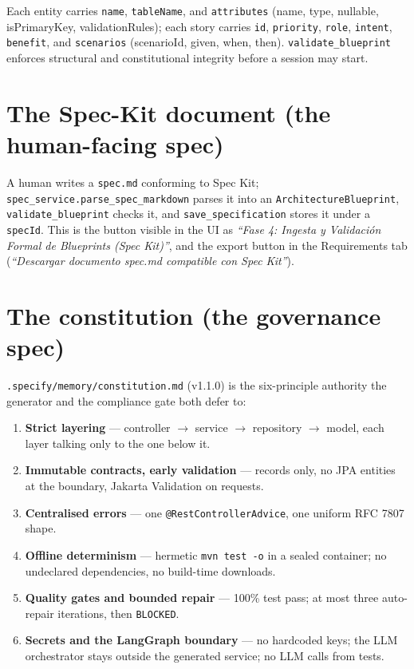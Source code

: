 \documentclass[11pt,a4paper]{article}
\begin{document}
Each entity carries \texttt{name}, \texttt{tableName}, and \texttt{attributes}
(name, type, nullable, isPrimaryKey, validationRules); each story carries \texttt{id},
\texttt{priority}, \texttt{role}, \texttt{intent}, \texttt{benefit}, and
\texttt{scenarios} (scenarioId, given, when, then). \texttt{validate\_blueprint}
enforces structural and constitutional integrity before a session may start.

\section{The Spec-Kit document (the human-facing spec)}

A human writes a \texttt{spec.md} conforming to Spec Kit; \texttt{spec\_service.parse\_spec\_markdown}
parses it into an \texttt{ArchitectureBlueprint}, \texttt{validate\_blueprint} checks
it, and \texttt{save\_specification} stores it under a \texttt{specId}. This is the
button visible in the UI as \emph{``Fase 4: Ingesta y Validación Formal de Blueprints
(Spec Kit)''}, and the export button in the Requirements tab
(\emph{``Descargar documento spec.md compatible con Spec Kit''}).

\section{The constitution (the governance spec)}

\texttt{.specify/memory/constitution.md} (v1.1.0) is the six-principle authority the
generator and the compliance gate both defer to:

\begin{enumerate}[leftmargin=1.4em]
  \item \textbf{Strict layering} --- controller $\rightarrow$ service $\rightarrow$
  repository $\rightarrow$ model, each layer talking only to the one below it.
  \item \textbf{Immutable contracts, early validation} --- records only, no JPA
  entities at the boundary, Jakarta Validation on requests.
  \item \textbf{Centralised errors} --- one \texttt{@RestControllerAdvice}, one uniform
  RFC 7807 shape.
  \item \textbf{Offline determinism} --- hermetic \texttt{mvn test -o} in a sealed
  container; no undeclared dependencies, no build-time downloads.
  \item \textbf{Quality gates and bounded repair} --- 100\% test pass; at most three
  auto-repair iterations, then \texttt{BLOCKED}.
  \item \textbf{Secrets and the LangGraph boundary} --- no hardcoded keys; the LLM
  orchestrator stays outside the generated service; no LLM calls from tests.
\end{enumerate}
\end{document}
